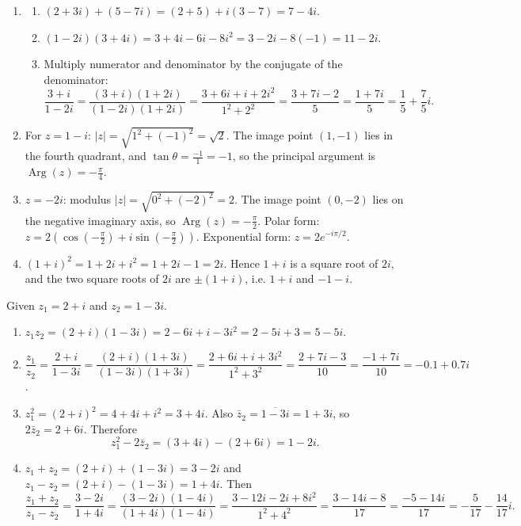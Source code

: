 \documentclass[11pt]{article}
\begin{document}
\begin{corrige}
\begin{enumerate}
\item \begin{enumerate}
\item $(2+3i)+(5-7i) = (2+5) + i(3-7) = 7 - 4i$.
\item $(1-2i)(3+4i) = 3 + 4i - 6i - 8i^2 = 3 - 2i - 8(-1) = 11 - 2i$.
\item Multiply numerator and denominator by the conjugate of the denominator:
\[
\dfrac{3+i}{1-2i} = \dfrac{(3+i)(1+2i)}{(1-2i)(1+2i)} = \dfrac{3+6i+i+2i^2}{1^2+2^2} = \dfrac{3+7i-2}{5} = \dfrac{1+7i}{5} = \frac{1}{5} + \frac{7}{5}i.
\]
\end{enumerate}
\item For $z = 1-i$: $|z| = \sqrt{1^2+(-1)^2} = \sqrt{2}$. The image point $(1,-1)$ lies in the fourth quadrant, and $\tan\theta = \frac{-1}{1} = -1$, so the principal argument is $\operatorname{Arg}(z) = -\frac{\pi}{4}$.
\item $z = -2i$: modulus $|z| = \sqrt{0^2+(-2)^2} = 2$. The image point $(0,-2)$ lies on the negative imaginary axis, so $\operatorname{Arg}(z) = -\frac{\pi}{2}$. Polar form: $z = 2\left(\cos\left(-\frac{\pi}{2}\right) + i\sin\left(-\frac{\pi}{2}\right)\right)$. Exponential form: $z = 2e^{-i\pi/2}$.
\item $(1+i)^2 = 1 + 2i + i^2 = 1 + 2i - 1 = 2i$. Hence $1+i$ is a square root of $2i$, and the two square roots of $2i$ are $\pm(1+i)$, i.e. $1+i$ and $-1-i$.
\end{enumerate}
\end{corrige}

\begin{corrige}
Given $z_1 = 2+i$ and $z_2 = 1-3i$.
\begin{enumerate}
\item $z_1z_2 = (2+i)(1-3i) = 2 - 6i + i - 3i^2 = 2 - 5i + 3 = 5 - 5i$.
\item $\dfrac{z_1}{z_2} = \dfrac{2+i}{1-3i} = \dfrac{(2+i)(1+3i)}{(1-3i)(1+3i)} = \dfrac{2+6i+i+3i^2}{1^2+3^2} = \dfrac{2+7i-3}{10} = \dfrac{-1+7i}{10} = -0.1 + 0.7i$.
\item $z_1^2 = (2+i)^2 = 4 + 4i + i^2 = 3 + 4i$. Also $\bar{z}_2 = \overline{1-3i} = 1+3i$, so $2\bar{z}_2 = 2+6i$. Therefore
\[
z_1^2 - 2\bar{z}_2 = (3+4i) - (2+6i) = 1 - 2i.
\]
\item $z_1+z_2 = (2+i)+(1-3i) = 3-2i$ and $z_1-z_2 = (2+i)-(1-3i) = 1+4i$. Then
\[
\frac{z_1+z_2}{z_1-z_2} = \frac{3-2i}{1+4i} = \frac{(3-2i)(1-4i)}{(1+4i)(1-4i)} = \frac{3-12i-2i+8i^2}{1^2+4^2} = \frac{3-14i-8}{17} = \frac{-5-14i}{17} = -\frac{5}{17} - \frac{14}{17}i.
\]
\end{enumerate}
\end{corrige}
\end{document}
